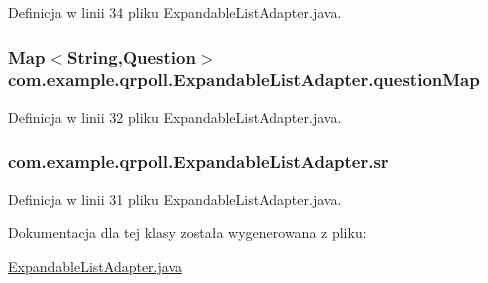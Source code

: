 Definicja w linii 34 pliku Expandable\+List\+Adapter.\+java.

\hypertarget{classcom_1_1example_1_1qrpoll_1_1_expandable_list_adapter_a5ec37e3c4af51739b2c0cd282b9bf208}{
\subsubsection[{question\+Map}]{\setlength{\rightskip}{0pt plus 5cm}Map$<$String,{\bf Question}$>$ com.\+example.\+qrpoll.\+Expandable\+List\+Adapter.\+question\+Map\hspace{0.3cm}{\ttfamily [private]}}}\label{classcom_1_1example_1_1qrpoll_1_1_expandable_list_adapter_a5ec37e3c4af51739b2c0cd282b9bf208}


Definicja w linii 32 pliku Expandable\+List\+Adapter.\+java.

\hypertarget{classcom_1_1example_1_1qrpoll_1_1_expandable_list_adapter_a38af3904440bf552715d92f8c6e1375d}{
\subsubsection[{sr}]{ com.\+example.\+qrpoll.\+Expandable\+List\+Adapter.\+sr}}\label{classcom_1_1example_1_1qrpoll_1_1_expandable_list_adapter_a38af3904440bf552715d92f8c6e1375d}


Definicja w linii 31 pliku Expandable\+List\+Adapter.\+java.



Dokumentacja dla tej klasy została wygenerowana z pliku\+:\begin{DoxyCompactItemize}
\item 
\hyperlink{_expandable_list_adapter_8java}{Expandable\+List\+Adapter.\+java}\end{DoxyCompactItemize}
